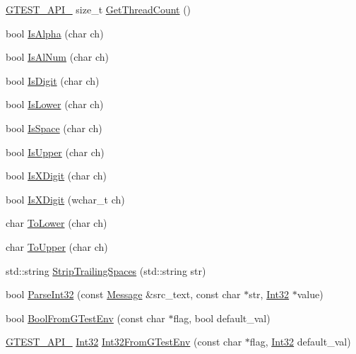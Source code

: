 \begin{DoxyCompactItemize}
\item 
\hyperlink{gtest-port_8h_aa73be6f0ba4a7456180a94904ce17790}{G\+T\+E\+S\+T\+\_\+\+A\+P\+I\+\_\+} size\+\_\+t \hyperlink{namespacetesting_1_1internal_a3b9b3649cd04558bf46c75de52a7ef34}{Get\+Thread\+Count} ()
\item 
bool \hyperlink{namespacetesting_1_1internal_aeb957087fd6bbf9db98ab7cd41b0c129}{Is\+Alpha} (char ch)
\item 
bool \hyperlink{namespacetesting_1_1internal_a83802e7f23324cd512232203662e1a98}{Is\+Al\+Num} (char ch)
\item 
bool \hyperlink{namespacetesting_1_1internal_a4bd96b7fa6486802d33ddc217af55a39}{Is\+Digit} (char ch)
\item 
bool \hyperlink{namespacetesting_1_1internal_ac26ce3883bc8919c27074975e958f3b7}{Is\+Lower} (char ch)
\item 
bool \hyperlink{namespacetesting_1_1internal_af429e04f70f9c10f6aa76a5d1ccd389f}{Is\+Space} (char ch)
\item 
bool \hyperlink{namespacetesting_1_1internal_a84f3baa379fec6bf5947cb5165aa8cc9}{Is\+Upper} (char ch)
\item 
bool \hyperlink{namespacetesting_1_1internal_aa234ef141278263fb143b616c74c86e7}{Is\+X\+Digit} (char ch)
\item 
bool \hyperlink{namespacetesting_1_1internal_a6ab68a30f8291c09b2289c132bbe3b16}{Is\+X\+Digit} (wchar\+\_\+t ch)
\item 
char \hyperlink{namespacetesting_1_1internal_ad9c627ef2a94245e3fd69e7ab3d49b42}{To\+Lower} (char ch)
\item 
char \hyperlink{namespacetesting_1_1internal_ac1b876a8133895bd553d4780ecaa1e3a}{To\+Upper} (char ch)
\item 
std\+::string \hyperlink{namespacetesting_1_1internal_aa6afda12e567c353e2e9b9c2e8cae14f}{Strip\+Trailing\+Spaces} (std\+::string str)
\item 
bool \hyperlink{namespacetesting_1_1internal_ac06fc81336a3d80755f4020d34321766}{Parse\+Int32} (const \hyperlink{classtesting_1_1_message}{Message} \&src\+\_\+text, const char $\ast$str, \hyperlink{namespacetesting_1_1internal_a8ee38faaf875f133358abaf9bc056cec}{Int32} $\ast$value)
\item 
bool \hyperlink{namespacetesting_1_1internal_a67132cdce23fb71b6c38ee34ef81eb4c}{Bool\+From\+G\+Test\+Env} (const char $\ast$flag, bool default\+\_\+val)
\item 
\hyperlink{gtest-port_8h_aa73be6f0ba4a7456180a94904ce17790}{G\+T\+E\+S\+T\+\_\+\+A\+P\+I\+\_\+} \hyperlink{namespacetesting_1_1internal_a8ee38faaf875f133358abaf9bc056cec}{Int32} \hyperlink{namespacetesting_1_1internal_a0f7e728793f9e6cb0aa2b69eaa468bf3}{Int32\+From\+G\+Test\+Env} (const char $\ast$flag, \hyperlink{namespacetesting_1_1internal_a8ee38faaf875f133358abaf9bc056cec}{Int32} default\+\_\+val)

\end{DoxyCompactItemize}
